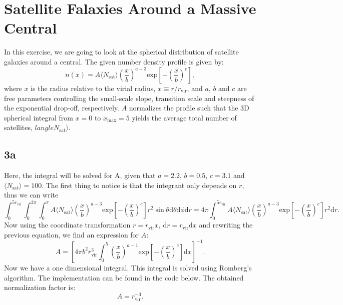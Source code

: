 \section{Satellite Falaxies Around a Massive Central}
In this exercise, we are going to look at the spherical distribution of satellite galaxies around a central. The given number density profile is given by:
\begin{equation}
  n(x) = A \langle N_\mathrm{sat}\rangle \left( \frac{x}{b} \right) ^{a-3} \mathrm{exp} \left[ - \left( \frac{x}{b} \right)^{c} \right],
\end{equation}
where $x$ is the radius relative to the virial radius, $x\equiv r/r_\mathrm{vir}$, and $a$, $b$ and $c$ are free parameters controlling the small-scale slope, transition scale and steepness of the exponential drop-off, respectively. $A$ normalizes the profile such that the 3D spherical integral from $x=0$ to $x_\mathrm{max}=5$ yields the average total number of satellites, $langle N_\mathrm{sat}\rangle$.

\subsection*{3a}
Here, the integral will be solved for A, given that $a = 2.2$, $b = 0.5$, $c = 3.1$ and $\langle N_\mathrm{sat}\rangle = 100$. The first thing to notice is that the integrant only depends on $r$, thus we can write
\begin{equation}
  \int_0^{5r_{\mathrm{vir}}} \int_0^{2\pi} \int_0^{\pi} A \langle N_\mathrm{sat}\rangle \left( \frac{x}{b} \right) ^{a-3} \mathrm{exp} \left[ - \left( \frac{x}{b} \right)^{c} \right] r^2 \sin\theta \mathrm{d}\theta \mathrm{d}\phi \mathrm{d}r = 4\pi \int_0^{5r_{\mathrm{vir}}} A \langle N_\mathrm{sat}\rangle \left( \frac{x}{b} \right) ^{a-3} \mathrm{exp} \left[ - \left( \frac{x}{b} \right)^{c} \right] r^2 \mathrm{d}r.
\end{equation}
Now using the coordinate transformation $r = r_{\mathrm{vir}}x$,  $\mathrm{d}r = r_{\mathrm{vir}}\mathrm{d}x$ and rewriting the previous equation, we find an expression for $A$:
\begin{equation}
  A = \left[ 4\pi b^2 r_{\mathrm{vir}}^3 \int_0^5 \left( \frac{x}{b} \right)^{a-1} \mathrm{exp} \left[ - \left( \frac{x}{b} \right)^{c} \right] \mathrm{d}x   \right]^{-1}.
\end{equation}
Now we have a one dimensional integral. This integral is solved using Romberg's algorithm. The implementation can be found in the code below. The obtained normalization factor is: $$A = r_\mathrm{vir}^{-3}.$$

